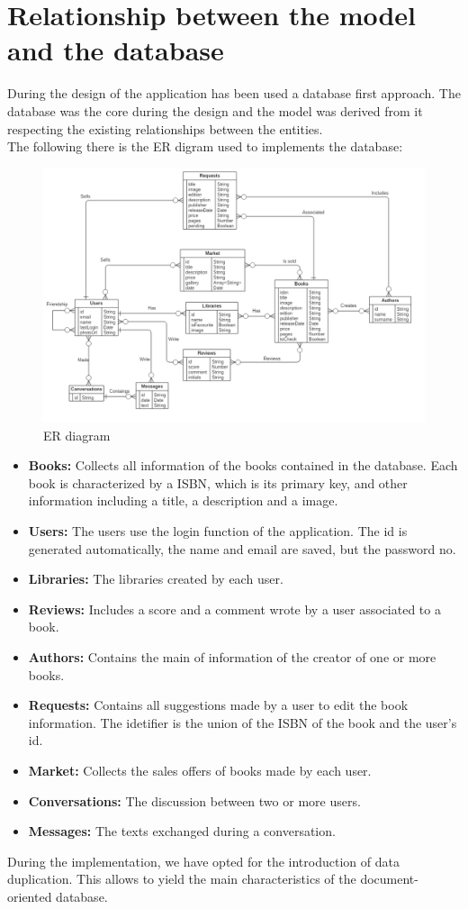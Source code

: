 \section{Relationship between the model and the database}
During the design of the application has been used a database first approach. The database was the core during the design and the model was derived from it 
respecting the existing relationships between the entities.\\
The following there is the ER digram used to implements the database:
\begin{figure}[!h]
    \centering
    \includegraphics[scale=0.43]{images/er-diagram.png}
    \caption{ER diagram}
    \label{ref:erdiagram}
\end{figure}
\begin{itemize}
    \item
    \textbf{Books:} Collects all information of the books contained in the database. Each book is characterized  by a ISBN, which is its primary key, and other information including a title, a description and a image.
    \item
    \textbf{Users:} The users use the login function of the application. The id is generated automatically, the name and email are saved, but the password no.
    \item
    \textbf{Libraries:} The libraries created by each user.
    \item
    \textbf{Reviews:} Includes a score and a comment wrote by a user associated to a book.
    \item
    \textbf{Authors:} Contains the main of information of the creator of one or more books.
    \item
    \textbf{Requests:} Contains all suggestions made by a user to edit the book information. The idetifier is the union of the ISBN of the book and the user's id.
    \item
    \textbf{Market:} Collects the sales offers of books made by each user.
    \item
    \textbf{Conversations:} The discussion between two or more users.
    \item
    \textbf{Messages:} The texts exchanged during a conversation.
\end{itemize}
During the implementation, we have opted for the introduction of data duplication. This allows to yield the main characteristics of the document-oriented database.


